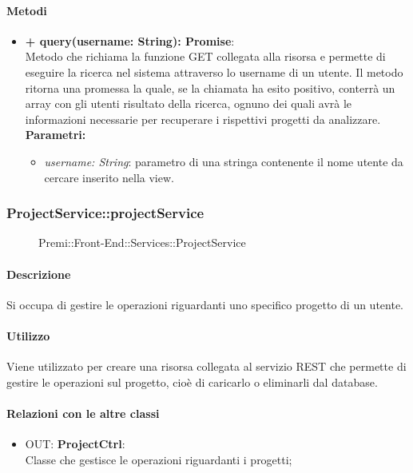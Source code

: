 		\paragraph{Metodi}
		\begin{itemize}
			\item \textbf{+ query(username: String): Promise}:\\
			Metodo che richiama la funzione GET collegata alla risorsa e permette di eseguire la ricerca nel sistema attraverso lo username di un utente. Il metodo ritorna una promessa la quale, se la chiamata ha esito positivo, conterrà un array con gli utenti risultato della ricerca, ognuno dei quali avrà le informazioni necessarie per recuperare i rispettivi progetti da analizzare.\\
			\textbf{Parametri:}\\
			\begin{itemize}
				\item \textit{username: String}: parametro di una stringa contenente il nome utente da cercare inserito nella view.
			\end{itemize}
		\end{itemize}
		
		
		\subsubsection{ProjectService::projectService}
		\begin{figure}[h]
			\centering
			\caption[Premi::Front-End::Services::ProjectService]{Premi::Front-End::Services::ProjectService}
		\end{figure}
		
		\paragraph{Descrizione}
		Si occupa di gestire le operazioni riguardanti uno specifico progetto di un utente.
		
		\paragraph{Utilizzo}
		Viene utilizzato per creare una risorsa collegata al servizio REST che permette di gestire le operazioni sul progetto, cioè di caricarlo o eliminarli dal database.
		
		\paragraph{Relazioni con le altre classi}
		\begin{itemize}
			\item OUT: \textbf{ProjectCtrl}:\\
			Classe che gestisce le operazioni riguardanti i progetti;
		\end{itemize}
		
